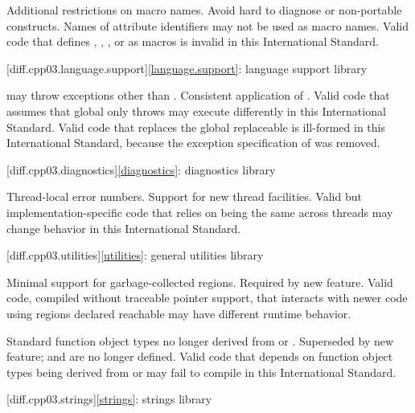 \change Additional restrictions on macro names.
\rationale Avoid hard to diagnose or non-portable constructs.
\effect
Names of attribute identifiers may not be used as macro names. Valid \CppIII{}
code that defines , ,
, or  as macros is invalid in this
International Standard.

[diff.cpp03.language.support]{\ref{language.support}:
language support library}

\change {} may throw exceptions other than
.
\rationale Consistent application of .
\effect
Valid \CppIII{} code that assumes that global  only
throws  may execute differently in this International
Standard.
Valid \CppIII{} code that replaces the global replaceable 
is ill-formed in this International Standard,
because the exception specification of 
was removed.

[diff.cpp03.diagnostics]{\ref{diagnostics}: diagnostics library}

\change Thread-local error numbers.
\rationale Support for new thread facilities.
\effect Valid but implementation-specific \CppIII{} code that relies on
 being the same across threads may change behavior in this
International Standard.

[diff.cpp03.utilities]{\ref{utilities}: general utilities library}

\change Minimal support for garbage-collected regions.
\rationale Required by new feature.
\effect
Valid \CppIII{} code, compiled without traceable pointer support,
that interacts with newer \Cpp{} code using regions declared reachable may
have different runtime behavior.

\change Standard function object types no longer derived from
 or .
\rationale Superseded by new feature;  and
 are no longer defined.
\effect
Valid \CppIII{} code that depends on function object types being derived from
 or  may fail to compile
in this International Standard.

[diff.cpp03.strings]{\ref{strings}: strings library}


